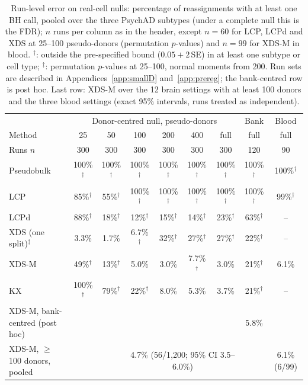 \begin{table}[!t]\centering\setlength{\tabcolsep}{3.2pt}
\caption{Run-level error on real-cell nulls: percentage of reassignments with at least one BH call, pooled over the three PsychAD subtypes (under a complete null this is the FDR); $n$ runs per column as in the header, except $n=60$ for LCP, LCPd and XDS at 25--100 pseudo-donors (permutation $p$-values) and $n=99$ for XDS-M in blood. $^\dagger$: outside the pre-specified bound ($0.05+2$\,SE) in at least one subtype or cell type; $^\ddagger$: permutation $p$-values at 25--100, normal moments from 200. Run sets are described in Appendices~\ref{app:smallD} and~\ref{app:prereg}; the bank-centred row is post hoc. Last row: XDS-M over the 12 brain settings with at least 100 donors and the three blood settings (exact 95\% intervals, runs treated as independent).}\label{tab:calib}
\begin{tabular}{lcccccc|c|c}\toprule & \multicolumn{6}{c|}{Donor-centred null, pseudo-donors} & Bank & Blood\\
Method & 25 & 50 & 100 & 200 & 400 & full & full & full\\
Runs $n$ & 300 & 300 & 300 & 300 & 300 & 300 & 120 & 90\\\midrule
Pseudobulk & 100\%$^\dagger$ & 100\%$^\dagger$ & 100\%$^\dagger$ & 100\%$^\dagger$ & 100\%$^\dagger$ & 100\%$^\dagger$ & 100\%$^\dagger$ & 100\%$^\dagger$\\
LCP & 85\%$^\dagger$ & 55\%$^\dagger$ & 100\%$^\dagger$ & 100\%$^\dagger$ & 100\%$^\dagger$ & 100\%$^\dagger$ & 100\%$^\dagger$ & 99\%$^\dagger$\\
LCPd & 88\%$^\dagger$ & 18\%$^\dagger$ & 12\%$^\dagger$ & 15\%$^\dagger$ & 14\%$^\dagger$ & 23\%$^\dagger$ & 63\%$^\dagger$ & --\\
XDS (one split)$^\ddagger$ & 3.3\% & 1.7\% & 6.7\%$^\dagger$ & 32\%$^\dagger$ & 27\%$^\dagger$ & 27\%$^\dagger$ & 22\%$^\dagger$ & --\\
XDS-M & 49\%$^\dagger$ & 13\%$^\dagger$ & 5.0\% & 3.0\% & 7.7\%$^\dagger$ & 3.0\% & 21\%$^\dagger$ & 6.1\%\\
KX & 100\%$^\dagger$ & 79\%$^\dagger$ & 22\%$^\dagger$ & 8.0\% & 5.3\% & 3.7\% & 21\%$^\dagger$ & --\\
XDS-M, bank-centred (post hoc) & & & & & & & 5.8\% & \\
\midrule XDS-M, $\ge$100 donors, pooled & & & \multicolumn{4}{c}{4.7\% (56/1{,}200; 95\% CI 3.5--6.0\%)} & & 6.1\% (6/99)\\
\bottomrule\end{tabular}\end{table}

